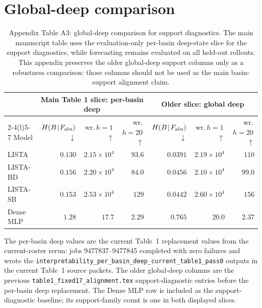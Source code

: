 \section{Global-deep comparison}
\label{sec:supp_table_a3_global_deep_comparison}

\begin{table}[tbp]
\centering
\caption{Appendix Table A3: global-deep comparison for support diagnostics. The
main manuscript table uses the evaluation-only per-basin deep-state slice for
the support diagnostics, while forecasting remains evaluated on all held-out
rollouts. This appendix preserves the older global-deep support columns only as
a robustness comparison: those columns should not be used as the main
basin-support alignment claim.}
\label{tab:a3_global_deep_comparison}
\begin{tabular}{@{}l rrr rrr@{}}
\toprule
& \multicolumn{3}{c}{Main Table 1 slice: per-basin deep} &
  \multicolumn{3}{c}{Older slice: global deep} \\
\cmidrule(lr){2-4}\cmidrule(l){5-7}
Model &
$H(B\!\mid\!F_{\rm abs})$\,$\downarrow$ &
wr.\,$h{=}1$\,$\uparrow$ &
wr.\,$h{=}20$\,$\uparrow$ &
$H(B\!\mid\!F_{\rm abs})$\,$\downarrow$ &
wr.\,$h{=}1$\,$\uparrow$ &
wr.\,$h{=}20$\,$\uparrow$ \\
\midrule
LISTA &
$0.130$ & $2.15{\times}10^{4}$ & $93.6$ &
$0.0391$ & $2.19{\times}10^{4}$ & $110$ \\
LISTA-BD &
$0.156$ & $2.20{\times}10^{4}$ & $84.0$ &
$0.0456$ & $2.10{\times}10^{4}$ & $99.0$ \\
LISTA-SB &
$0.153$ & $2.53{\times}10^{4}$ & $129$ &
$0.0442$ & $2.60{\times}10^{4}$ & $156$ \\
Dense MLP &
$1.28$ & $17.7$ & $2.29$ &
$0.765$ & $20.0$ & $2.37$ \\
\bottomrule
\end{tabular}
\vspace{0.5ex}
\begin{minipage}{0.96\linewidth}
\footnotesize
The per-basin deep values are the current Table~1 replacement values from the
current-roster rerun: jobs 9477837--9477845 completed with zero failures and
wrote the \texttt{interpretability\_per\_basin\_deep\_current\_table1\_pass0}
outputs in the current Table~1 source packets. The older global-deep columns
are the previous \texttt{table1\_fixed17\_alignment.tex} support-diagnostic
entries before the per-basin deep replacement. The Dense MLP row is included
as the support-diagnostic baseline; its support-family count is one in both
displayed slices.
\end{minipage}
\end{table}
